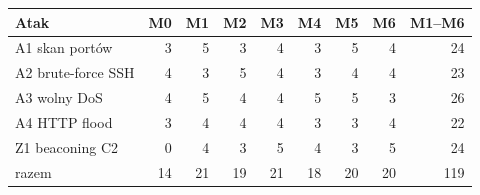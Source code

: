 \begin{tabular}{lrrrrrrrr}
\toprule
Atak & M0 & M1 & M2 & M3 & M4 & M5 & M6 & M1--M6 \\
\midrule
A1 skan portów & 3 & 5 & 3 & 4 & 3 & 5 & 4 & 24 \\
A2 brute-force SSH & 4 & 3 & 5 & 4 & 3 & 4 & 4 & 23 \\
A3 wolny DoS & 4 & 5 & 4 & 4 & 5 & 5 & 3 & 26 \\
A4 HTTP flood & 3 & 4 & 4 & 4 & 3 & 3 & 4 & 22 \\
Z1 beaconing C2 & 0 & 4 & 3 & 5 & 4 & 3 & 5 & 24 \\
\midrule
razem & 14 & 21 & 19 & 21 & 18 & 20 & 20 & 119 \\
\bottomrule
\end{tabular}
